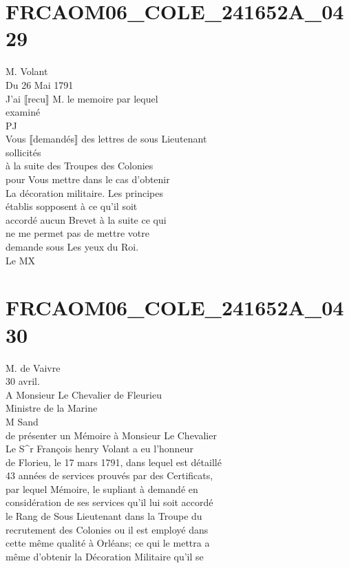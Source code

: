\documentclass{article}
\begin{document}
\begin{pages}
\endnumbering\beginnumbering\section{FRCAOM06\_COLE\_241652A\_0429}\pstart
M. Volant\\
Du 26 Mai 1791\\
J'ai ⟦recu⟧ M. le memoire par lequel\\
examiné\\
PJ\\
Vous ⟦demandés⟧ des lettres de sous Lieutenant\\
sollicités\\
à la suite des Troupes des Colonies\\
pour Vous mettre dans le cas d'obtenir\\
La décoration militaire. Les principes\\
établis sopposent  à ce qu'il soit\\
accordé aucun Brevet à la suite ce qui\\
ne me permet pas de mettre votre\\
demande sous Les yeux du Roi.\\
Le MX
\pend
\endnumbering\beginnumbering\section{FRCAOM06\_COLE\_241652A\_0430}\pstart
M. de Vaivre\\
30 avril.\\
A Monsieur Le Chevalier de Fleurieu\\
Ministre de la Marine\\
M Sand\\
de présenter un Mémoire à Monsieur Le Chevalier\\
Le S\^{}r François henry Volant a eu l'honneur\\
de Florieu, le 17 mars 1791, dans lequel est détaillé\\
43 années de services prouvés par des Certificats,\\
par lequel Mémoire, le supliant à demandé en\\
considération de ses services qu'il lui soit accordé\\
le Rang de Sous Lieutenant dans la Troupe du\\
recrutement des Colonies ou il est employé dans\\
cette même qualité à Orléans; ce qui le mettra a\\
même d'obtenir la Décoration Militaire qu'il se\\

\end{pages}
\end{document}
